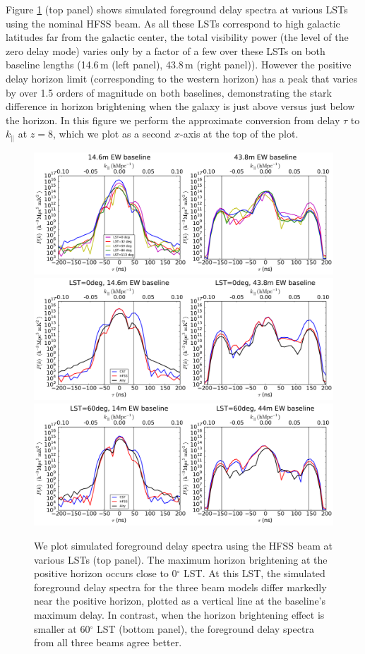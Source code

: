 \documentclass{emulateapj}
\begin{document}
Figure \ref{fig:delayspec} (top panel) shows simulated foreground delay spectra at various LSTs using the nominal HFSS beam. As all these LSTs correspond to high galactic latitudes far from the galactic center, the total visibility power (the level of the zero delay mode) varies only by a factor of a few over these LSTs on both baseline lengths (14.6\,m (left panel), 43.8\,m (right panel)). However the positive delay horizon limit (corresponding to the western horizon) has a peak that varies by over 1.5 orders of magnitude on both baselines, demonstrating the stark difference in horizon brightening when the galaxy is just above versus just below the horizon. In this figure we perform the approximate conversion from delay $\tau$ to $k_\parallel$ at $z=8$, which we plot as a second $x$-axis at the top of the plot. 

\begin{figure}[h]
\centering
\includegraphics[width=6in]{nithya_fg_pspec_all_lst.pdf}
\includegraphics[width=6in]{nithya_fg_pspec_lst0deg.pdf}
\includegraphics[width=6in]{nithya_fg_pspec_lst60deg.pdf}
\caption{We plot simulated foreground delay spectra using the HFSS beam at various LSTs (top panel). The maximum horizon brightening at the positive horizon occurs close to 0$^\circ$ LST. At this LST, the simulated foreground delay spectra for the three beam models differ markedly near the positive horizon, plotted as a vertical line at the baseline's maximum delay. In contrast, when the horizon brightening effect is smaller at 60$^\circ$ LST (bottom panel), the foreground delay spectra from all three beams agree better.}
\label{fig:delayspec}
\end{figure}
\end{document}
